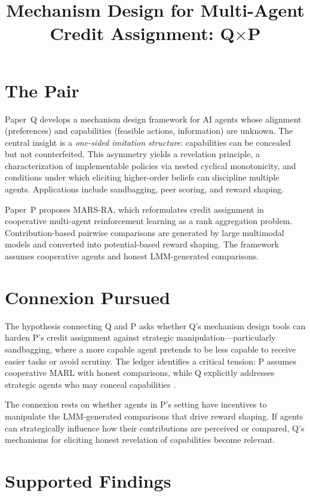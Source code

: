 \documentclass{article}
\title{Mechanism Design for Multi-Agent Credit Assignment: Q$\times$P}
\begin{document}
\maketitle

\section*{The Pair}

Paper~Q develops a mechanism design framework for AI agents whose alignment (preferences) and capabilities (feasible actions, information) are unknown. The central insight is a \emph{one-sided imitation structure}: capabilities can be concealed but not counterfeited. This asymmetry yields a revelation principle, a characterization of implementable policies via nested cyclical monotonicity, and conditions under which eliciting higher-order beliefs can discipline multiple agents. Applications include sandbagging, peer scoring, and reward shaping.

Paper~P proposes MARS-RA, which reformulates credit assignment in cooperative multi-agent reinforcement learning as a rank aggregation problem. Contribution-based pairwise comparisons are generated by large multimodal models and converted into potential-based reward shaping. The framework assumes cooperative agents and honest LMM-generated comparisons.

\section*{Connexion Pursued}

The hypothesis connecting Q and P asks whether Q's mechanism design tools can harden P's credit assignment against strategic manipulation---particularly sandbagging, where a more capable agent pretends to be less capable to receive easier tasks or avoid scrutiny. The ledger identifies a critical tension: P assumes cooperative MARL with honest comparisons, while Q explicitly addresses strategic agents who may conceal capabilities .

The connexion rests on whether agents in P's setting have incentives to manipulate the LMM-generated comparisons that drive reward shaping. If agents can strategically influence how their contributions are perceived or compared, Q's mechanisms for eliciting honest revelation of capabilities become relevant.

\section*{Supported Findings}
\end{document}
